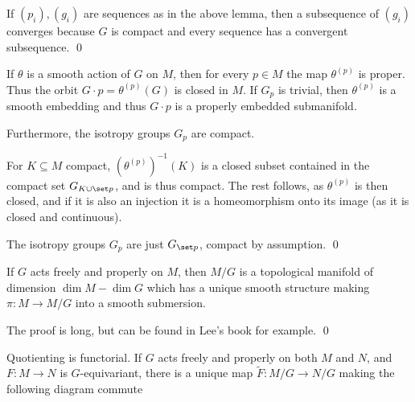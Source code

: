 \ecoro

\bproof

    If $(p_i),(g_i)$ are sequences as in the above lemma, then a subsequence of $(g_i)$ converges because $G$ is compact and every sequence
    has a convergent subsequence.
    \qed

\eproof

\bprop

    If $\theta$ is a smooth action of $G$ on $M$, then for every $p\in M$ the map $\theta^{(p)}$ is proper.
    Thus the orbit $G\cdot p=\theta^{(p)}(G)$ is closed in $M$.
    If $G_p$ is trivial, then $\theta^{(p)}$ is a smooth embedding and thus $G\cdot p$ is a properly embedded submanifold.

    Furthermore, the isotropy groups $G_p$ are compact.

\eprop

\bproof

    For $K\subseteq M$ compact, $(\theta^{(p)})^{-1}(K)$ is a closed subset contained in the compact set $G_{K\cup\set p}$, and is thus
    compact.
    The rest follows, as $\theta^{(p)}$ is then closed, and if it is also an injection it is a homeomorphism onto its image (as it is closed
    and continuous).

    The isotropy groups $G_p$ are just $G_{\set p}$, compact by assumption.
    \qed

\eproof

\bthrm

    If $G$ acts freely and properly on $M$, then $M/G$ is a topological manifold of dimension $\dim M-\dim G$ which has a
    unique smooth structure making $\pi\colon M\to M/G$ into a smooth submersion.

\ethrm

\bproof

    The proof is long, but can be found in Lee's book for example.
    \qed

\eproof

\bthrm

    Quotienting is functorial.
    If $G$ acts freely and properly on both $M$ and $N$, and $F\colon M\to N$ is $G$-equivariant, there is a unique map
    $\tilde F\colon M/G\to N/G$ making the following diagram commute

    \centerline{}

